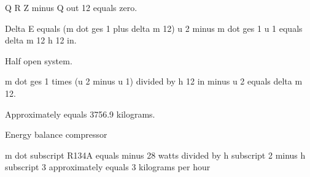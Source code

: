 Q R Z minus Q out 12 equals zero.

Delta E equals (m dot ges 1 plus delta m 12) u 2 minus m dot ges 1 u 1 equals delta m 12 h 12 in.

Half open system.

m dot ges 1 times (u 2 minus u 1) divided by h 12 in minus u 2 equals delta m 12.

Approximately equals 3756.9 kilograms.

Energy balance compressor

m dot subscript R134A equals minus 28 watts divided by h subscript 2 minus h subscript 3 approximately equals 3 kilograms per hour